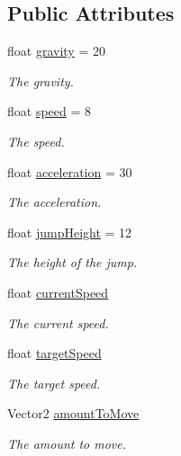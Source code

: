 \subsection*{Public Attributes}
\begin{DoxyCompactItemize}
\item 
float \hyperlink{classPlayerController_a0a8e0eb9de4ccc5bd5f4cc5b44469b01}{gravity} = 20
\begin{DoxyCompactList}\small\item\em The gravity. \end{DoxyCompactList}\item 
float \hyperlink{classPlayerController_a0928605583f0563cd84fe43119d336ec}{speed} = 8
\begin{DoxyCompactList}\small\item\em The speed. \end{DoxyCompactList}\item 
float \hyperlink{classPlayerController_a421aa51bfbc7338f353ca84ea446de96}{acceleration} = 30
\begin{DoxyCompactList}\small\item\em The acceleration. \end{DoxyCompactList}\item 
float \hyperlink{classPlayerController_a1f5dfe5afd998f509dbb405800619b6d}{jump\-Height} = 12
\begin{DoxyCompactList}\small\item\em The height of the jump. \end{DoxyCompactList}\item 
float \hyperlink{classPlayerController_a015c55d3a7c7eed11bdec88c2fb81899}{current\-Speed}
\begin{DoxyCompactList}\small\item\em The current speed. \end{DoxyCompactList}\item 
float \hyperlink{classPlayerController_a40ea46cad3dd02224b1b5d05bb530dcc}{target\-Speed}
\begin{DoxyCompactList}\small\item\em The target speed. \end{DoxyCompactList}\item 
Vector2 \hyperlink{classPlayerController_abdda9ecec7708206e6e01b1ead96f5c9}{amount\-To\-Move}
\begin{DoxyCompactList}\small\item\em The amount to move. \end{DoxyCompactList}\item 

\end{DoxyCompactItemize}

